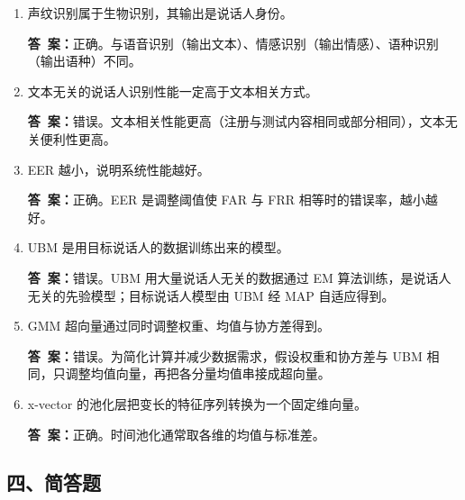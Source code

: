 \documentclass[10.5pt]{ctexart}
\newenvironment{qlist}
  {\begin{enumerate}[label={\sffamily\bfseries\color{accent}\arabic*.},leftmargin=2.4em,labelsep=0.55em,itemsep=0.62em,topsep=0.15em,parsep=0.3em,partopsep=0pt]}
  {\end{enumerate}}
\newcommand{\anslabel}{{\sffamily\bfseries\color{accent}答\ 案：}\hspace{0.35em}}
\newcommand{\ans}[1]{\par\vspace{2.15\baselineskip}\begin{ansbox}\anslabel #1\end{ansbox}}
\begin{document}
\begin{qlist}

\item 声纹识别属于生物识别，其输出是说话人身份。
\ans{正确。与语音识别（输出文本）、情感识别（输出情感）、语种识别（输出语种）不同。}

\item 文本无关的说话人识别性能一定高于文本相关方式。
\ans{错误。文本相关性能更高（注册与测试内容相同或部分相同），文本无关便利性更高。}

\item EER 越小，说明系统性能越好。
\ans{正确。EER 是调整阈值使 FAR 与 FRR 相等时的错误率，越小越好。}

\item UBM 是用目标说话人的数据训练出来的模型。
\ans{错误。UBM 用大量说话人无关的数据通过 EM 算法训练，是说话人无关的先验模型；目标说话人模型由 UBM 经 MAP 自适应得到。}

\item GMM 超向量通过同时调整权重、均值与协方差得到。
\ans{错误。为简化计算并减少数据需求，假设权重和协方差与 UBM 相同，只调整均值向量，再把各分量均值串接成超向量。}

\item x-vector 的池化层把变长的特征序列转换为一个固定维向量。
\ans{正确。时间池化通常取各维的均值与标准差。}

\end{qlist}

\subsection{四、简答题}
\end{document}
